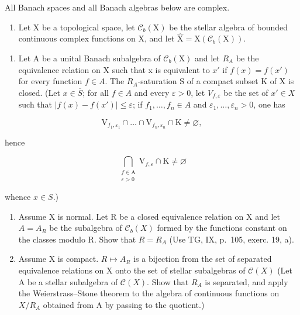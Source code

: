 
All Banach spaces and all Banach algebras below are complex.

\begin{enumerate}
\def\labelenumi{\arabic{enumi})}
\tightlist
\item
  Let X be a topological space, let \(\mathcal{C}_{b}(\mathrm{X})\) be the stellar algebra of bounded continuous complex functions on X, and let \(\widehat{\mathrm{X}} = \mathrm{X}(\mathcal{C}_{b}(\mathrm{X}))\).
\end{enumerate}

\begin{enumerate}
\def\labelenumi{\alph{enumi})}
\tightlist
\item
  Let A be a unital Banach subalgebra of \(\mathcal{C}_{b}(\mathrm{X})\) and let \(R_{A}\) be the equivalence relation on X such that x is equivalent to \(x'\) if \(f(x) = f(x')\) for every function \(f \in A\). The \(R_{A}\)-saturation S of a compact subset K of X is closed. (Let \(x \in \overline{S}\); for all \(f \in A\) and every \(\varepsilon > 0\), let \(V_{f,\varepsilon}\) be the set of \(x' \in X\) such that \(|f(x) - f(x')| \leqslant \varepsilon\); if \(f_{1}, \ldots, f_{n} \in A\) and \(\varepsilon_{1}, \ldots, \varepsilon_{n} > 0\), one has
\end{enumerate}

\[
\mathrm{V} _ {f _ {1}, \varepsilon_ {1}} \cap \dots \cap \mathrm{V} _ {f _ {n}, \varepsilon_ {n}} \cap \mathrm{K} \neq \varnothing ,
\]

hence

\[
\bigcap_{\substack{f\in \mathrm{A}\\ \varepsilon >0}}\mathrm{V}_{f,\varepsilon}\cap \mathrm{K}\neq \varnothing
\]

whence \(x \in S\).)

\begin{enumerate}
\def\labelenumi{\alph{enumi})}
\setcounter{enumi}{1}
\item
  Assume X is normal. Let R be a closed equivalence relation on X and let \(A = A_{R}\) be the subalgebra of \(\mathcal{C}_{b}(X)\) formed by the functions constant on the classes modulo R. Show that \(R = R_{A}\) (Use TG, IX, p.~105, exerc. 19, a).
\item
  Assume X is compact. \(R \mapsto A_{R}\) is a bijection from the set of separated equivalence relations on X onto the set of stellar subalgebras of \(\mathcal{C}(X)\) (Let A be a stellar subalgebra of \(\mathcal{C}(X)\). Show that \(R_{A}\) is separated, and apply the Weierstrass–Stone theorem to the algebra of continuous functions on \(X/R_{A}\) obtained from A by passing to the quotient.)
\end{enumerate}

